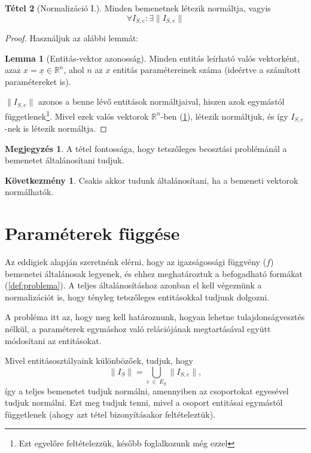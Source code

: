 \documentclass[twocolumn]{article}
\theoremstyle{definition}
\newtheorem{theorem}{Tétel}[section]
\newtheorem*{kov}{Következmény}
\newtheorem*{megj}{Megjegyzés}
\newtheorem{lemma}[theorem]{Lemma}
\newcommand{\vect}[1]{ \underline{#1} }
\newcommand{\norm}[1]{ \parallel {#1} \parallel }
\begin{document}
    \begin{theorem}[Normalizáció I.] \label{thm:norm1}
        Minden bemenetnek létezik normáltja, vagyis
        \begin{equation}
            \forall I_{S,e} : \exists \norm{I_{S,e}} 
        \end{equation}
        \begin{proof}
        Használjuk az alábbi lemmát:
            \begin{lemma}[Entitás-vektor azonosság] \label{lem:vektor}
                Minden entitás leírható valós vektorként, azaz 
                $x = \vect{x} \in \mathbb{R}^n$, 
                ahol $n$ az $x$ entitás paramétereinek száma (ideértve a számított paramétereket is).
            \end{lemma}
            $\parallel I_{S,e}\parallel $ azonos a benne lévő entitások normáltjaival, hiszen azok egymástól függetlenek\footnote{Ezt egyelőre feltételezzük, később foglalkozunk még ezzel}. Mivel ezek valós vektorok $\mathbb{R}^n$-ben (\ref{lem:vektor}), létezik normáltjuk, és így $I_{S,e}$-nek is létezik normáltja.
        \end{proof}
        \begin{megj}
            A tétel fontossága, hogy tetszőleges beosztási problémánál a bemenetet általánosítani tudjuk.
        \end{megj}
        \begin{kov}
            Csakis akkor tudunk általánosítani, ha a bemeneti vektorok normálhatók.
        \end{kov}
    \end{theorem}
    
\section{Paraméterek függése}

    Az eddigiek alapján szeretnénk elérni, hogy az igazságossági függvény ($f$) bemenetei általánosak legyenek, és ehhez meghatároztuk a befogadható formákat (\ref{def:problema}). A teljes általánosításhoz azonban el kell végeznünk a normalizációt is, hogy tényleg tetszőleges entitásokkal tudjunk dolgozni. 
    
    A probléma itt az, hogy meg kell határoznunk, hogyan lehetne tulajdonságvesztés nélkül, a paraméterek egymáshoz való relációjának megtartásával együtt módosítani az entitásokat.
    
    Mivel entitásosztályaink különbözőek, tudjuk, hogy
    \begin{equation}
        \norm{I_S}  = \bigcup_{e\ \in \ E_S} \norm{I_{S,e}} ,
    \end{equation}
    így a teljes bemenetet tudjuk normálni, amennyiben az csoportokat egyesével tudjuk normálni. Ezt meg tudjuk tenni, mivel a csoport entitásai egymástól függetlenek (ahogy azt \az{(\ref{thm:norm1})} tétel bizonyításakor feltételeztük).
    
\end{document}
